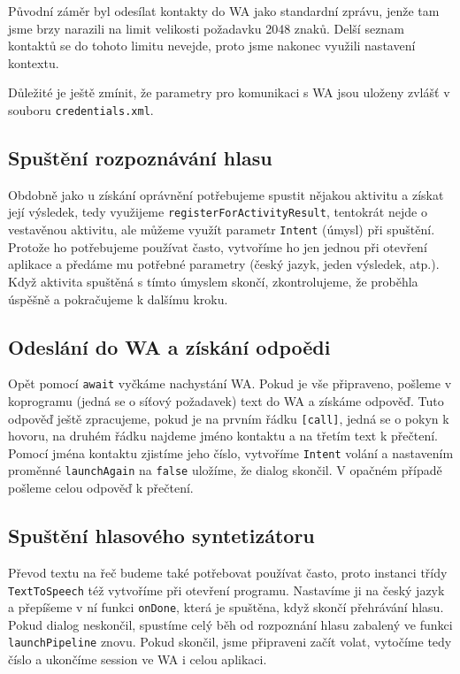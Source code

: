 Původní záměr byl odesílat kontakty do WA jako standardní zprávu, jenže
tam jsme brzy narazili na limit velikosti požadavku 2048 znaků. Delší
seznam kontaktů se do tohoto limitu nevejde, proto jsme nakonec využili
nastavení kontextu.

Důležité je ještě zmínit, že parametry pro komunikaci s WA jsou uloženy
zvlášť v souboru \texttt{credentials.xml}.

\subsection{Spuštění rozpoznávání hlasu}

Obdobně jako u získání
oprávnění potřebujeme spustit nějakou aktivitu a získat její výsledek, tedy
využijeme \texttt{registerForActivityResult}, tentokrát nejde o vestavěnou
aktivitu, ale můžeme využít parametr \texttt{Intent} (úmysl) při spuštění.
Protože ho potřebujeme používat často, vytvoříme ho jen jednou při otevření
aplikace a předáme mu potřebné parametry (český jazyk, jeden výsledek, atp.).
Když aktivita spuštěná s tímto úmyslem skončí, zkontrolujeme, že proběhla
úspěšně a pokračujeme k dalšímu kroku.

\subsection{Odeslání do WA a získání odpoědi}
Opět pomocí \texttt{await} vyčkáme nachystání WA. Pokud je vše připraveno,
pošleme v koprogramu (jedná se o síťový požadavek) text do WA a získáme odpověď.
Tuto odpověď ještě zpracujeme, pokud je na prvním řádku \texttt{[call]}, jedná
se o pokyn k hovoru, na druhém řádku najdeme jméno kontaktu a na třetím text k
přečtení. Pomocí jména kontaktu zjistíme jeho číslo, vytvoříme \texttt{Intent}
volání a nastavením proměnné \texttt{launchAgain} na \texttt{false} uložíme,
že dialog skončil. V opačném případě pošleme celou odpověď k přečtení.

\subsection{Spuštění hlasového syntetizátoru}

Převod textu na řeč budeme také potřebovat používat často, proto instanci
třídy \texttt{TextToSpeech} též vytvoříme při otevření programu. Nastavíme
ji na český jazyk a přepíšeme v ní funkci \texttt{onDone}, která je spuštěna,
když skončí přehrávání hlasu. Pokud dialog neskončil, spustíme celý běh
od rozpoznání hlasu zabalený ve funkci \texttt{launchPipeline} znovu. Pokud
skončil, jsme připraveni začít volat, vytočíme tedy číslo a ukončíme session ve
WA i celou aplikaci.

